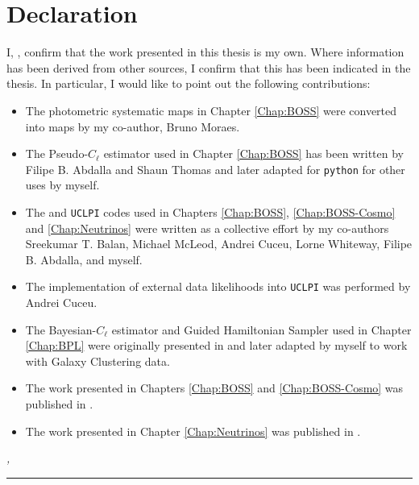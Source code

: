 %
\chapter*{Declaration}
\label{sec:declaration}
\thispagestyle{empty}

I, \thesisName , confirm that the work presented in this thesis is my own.
         Where information has been derived from other sources, I confirm that this has been indicated in the thesis. In particular, I would like to point out the following contributions:
\begin{itemize}
    \item The photometric systematic maps in Chapter \ref{Chap:BOSS} were converted into \healpix maps by my co-author, Bruno Moraes.
    \item The Pseudo-$C_{\ell}$ estimator used in Chapter \ref{Chap:BOSS} has been written by Filipe B. Abdalla and Shaun Thomas and later adapted for \texttt{python} for other uses by myself.
    \item The \uclcl and \texttt{UCLPI} codes used in Chapters \ref{Chap:BOSS}, \ref{Chap:BOSS-Cosmo} and \ref{Chap:Neutrinos} were written as a collective effort by my co-authors Sreekumar T. Balan, Michael McLeod, Andrei Cuceu, Lorne Whiteway, Filipe B. Abdalla, and myself.
    \item The implementation of external data likelihoods into \texttt{UCLPI} was performed by Andrei Cuceu.
    \item The Bayesian-$C_{\ell}$ estimator and Guided Hamiltonian Sampler used in Chapter \ref{Chap:BPL} were originally presented in \cite{SreeThesis} and later adapted by myself to work with Galaxy Clustering data.
    \item The work presented in Chapters \ref{Chap:BOSS} and \ref{Chap:BOSS-Cosmo} was published in \cite{2018LoureiroBOSS}.
    \item The work presented in Chapter \ref{Chap:Neutrinos} was published in \cite{2018LoureiroNeutrinos}.
\end{itemize}
         
\vspace*{\fill}

\noindent\textit{\thesisUniversityCity, \thesisDate}

\smallskip

\begin{flushright}
	\begin{minipage}{5cm}
		\rule{\textwidth}{1pt}
		\centering\thesisName
	\end{minipage}
\end{flushright}

